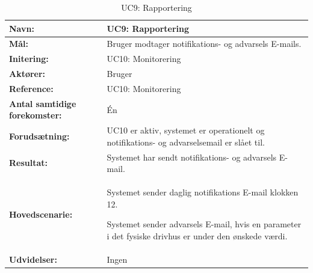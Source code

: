 \begin{table}[h]
\begin{tabularx}{\textwidth}{| >{\raggedright\arraybackslash}p{3.3 cm} | >{\raggedright\arraybackslash}X |} \hline

\textbf{Navn:} 						& UC9: Rapportering\\ \hline
\textbf{Mål:}						& Bruger modtager notifikations- og advarsels E-mails. \\ \hline
\textbf{Initering:}					& UC10: Monitorering \\ \hline
\textbf{Aktører:} 					& Bruger \\ \hline
\textbf{Reference:} 					& UC10: Monitorering \\ \hline
\textbf{Antal samtidige forekomster:} & Én \\ \hline
\textbf{Forudsætning:} 				& UC10 er aktiv, systemet er operationelt og notifikations- og advarselsemail er slået til. \\ \hline
\textbf{Resultat:}					& Systemet har sendt notifikations- og advarsels E-mail. \\ \hline
\textbf{Hovedscenarie:}				& 

\begin{packed_enum}
\item Systemet sender daglig notifikations E-mail klokken 12.
\item Systemet sender advarsels E-mail, hvis en parameter i det fysiske drivhus er under den ønskede værdi. 
\end{packed_enum}
\\ \hline
\textbf{Udvidelser:}				&  
Ingen \\ \hline
\end{tabularx}
\caption{UC9: Rapportering}
\label{tbl:UC9}
\end{table}

\clearpage
 

